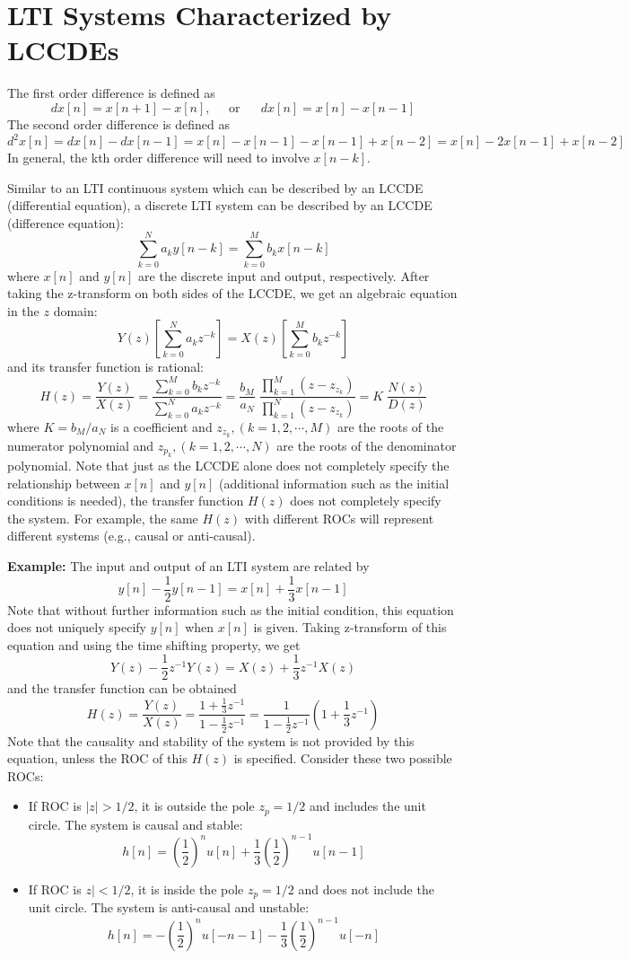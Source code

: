 \section*{LTI Systems Characterized by LCCDEs}

The first order difference is defined as 
\[ dx[n]=x[n+1]-x[n],\;\;\;\;\;\mbox{or}\;\;\;\;\;\;dx[n]=x[n]-x[n-1] \]
The second order difference is defined as 
\[ d^2 x[n]=dx[n]-dx[n-1]=x[n]-x[n-1]-x[n-1]+x[n-2]=x[n]-2x[n-1]+x[n-2] \]
In general, the kth order difference will need to involve $x[n-k]$. 

Similar to an LTI continuous system which can be described by an LCCDE 
(differential equation), a discrete LTI system can be described by an LCCDE 
(difference equation):
\[	\sum_{k=0}^N a_k y[n-k]=\sum_{k=0}^M b_k x[n-k]	\]
where $x[n]$ and $y[n]$ are the discrete input and output, respectively.
After taking the z-transform on both sides of the LCCDE, we get an algebraic 
equation in the $z$ domain:
\[ Y(z)[\sum_{k=0}^N a_k z^{-k}]=X(z)[\sum_{k=0}^M b_k z^{-k}]	\]
and its transfer function is rational:
\[
H(z)=\frac{Y(z)}{X(z)}=\frac{\sum_{k=0}^M b_k z^{-k}}{\sum_{k=0}^N a_k z^{-k}}
=\frac{b_M}{a_N} \; \frac{\prod_{k=1}^M (z-z_{z_k})}{\prod_{k=1}^N (z-z_{z_k})}
=K \; \frac{N(z)}{D(z)}	\]
where $K=b_M/a_N$ is a coefficient and $z_{z_k}, (k=1,2, \cdots, M)$ are the 
roots of the numerator polynomial and $z_{p_k}, (k=1,2, \cdots, N)$ are the 
roots of the denominator polynomial. Note that just as the LCCDE alone does 
not completely specify the relationship between $x[n]$ and $y[n]$ (additional 
information such as the initial conditions is needed), the transfer function 
$H(z)$ does not completely specify the system. For example, the same $H(z)$ 
with different ROCs will represent different systems (e.g., causal or anti-causal). 

{\bf Example:} The input and output of an LTI system are related by
\[	y[n]-\frac{1}{2}y[n-1]=x[n]+\frac{1}{3}x[n-1]	\]
Note that without further information such as the initial condition, this
equation does not uniquely specify $y[n]$ when $x[n]$ is given. Taking 
z-transform of this equation and using the time shifting property, we get
\[	Y(z)-\frac{1}{2}z^{-1}Y(z)=X(z)+\frac{1}{3}z^{-1}X(z)	\]
and the transfer function can be obtained
\[
H(z)=\frac{Y(z)}{X(z)}=\frac{1+\frac{1}{3}z^{-1}}{1-\frac{1}{2}z^{-1}}
=\frac{1}{1-\frac{1}{2}z^{-1}}(1+\frac{1}{3}z^{-1})	\]
Note that the causality and stability of the system is not provided by this
equation, unless the ROC of this $H(z)$ is specified. Consider these two 
possible ROCs:
\begin{itemize}
\item If ROC is $|z|>1/2$, it is outside the pole $z_p=1/2$ and includes 
	the unit circle. The system is causal and stable:
\[	h[n]=\left(\frac{1}{2}\right)^n u[n]+\frac{1}{3}\left(\frac{1}{2}\right)^{n-1}u[n-1]	\]
\item If ROC is $z|<1/2$, it is inside the pole $z_p=1/2$ and does not include
	the unit circle. The system is anti-causal and unstable:
\[	h[n]=-\left(\frac{1}{2}\right)^n u[-n-1]-\frac{1}{3}\left(\frac{1}{2}\right)^{n-1}u[-n]	\]
\end{itemize}

